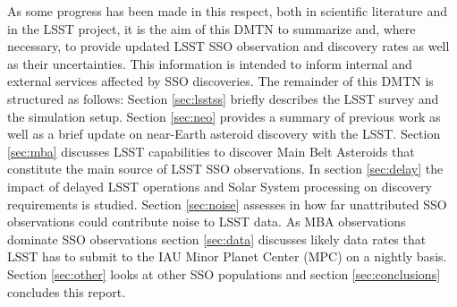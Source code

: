 As some progress has been made in this respect, both in scientific literature and in the \gls{LSST} project, it is the aim of this \gls{DMTN} to summarize and, where necessary, to provide updated \gls{LSST} \gls{SSO} observation and discovery rates as well as their uncertainties. This information is intended to inform internal and external services affected by \gls{SSO} discoveries.
The remainder of this \gls{DMTN} is structured as follows: Section \ref{sec:lsstss} briefly describes the \gls{LSST} survey and the simulation setup. Section \ref{sec:neo} provides a summary of previous work as well as a brief update on near-Earth asteroid discovery with the \gls{LSST}. Section \ref{sec:mba} discusses \gls{LSST} capabilities to discover Main Belt Asteroids that constitute the main source of \gls{LSST} \gls{SSO} observations. In section \ref{sec:delay} the impact of delayed \gls{LSST} operations and Solar System processing on discovery requirements is studied. Section \ref{sec:noise} assesses in how far unattributed \gls{SSO} observations could contribute noise to \gls{LSST} data. As MBA observations dominate \gls{SSO} observations section \ref{sec:data} discusses likely data rates that \gls{LSST} has to submit to the \gls{IAU} Minor Planet \gls{Center} (\gls{MPC}) on a nightly basis. Section \ref{sec:other}  looks at other \gls{SSO} populations and section \ref{sec:conclusions} concludes this report.

